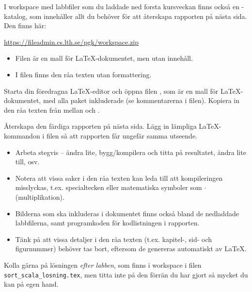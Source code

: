 \begin{Datorarbete}
	\item I workspace med labbfiler som du laddade ned forsta kursveckan finns också en -katalog, som innehåller allt du behöver för att återskapa rapporten på nästa sida. Den finns här:
	
	\url{https://fileadmin.cs.lth.se/pgk/workspace.zip}
	
	\begin{itemize}
		\item Filen  är en mall för \LaTeX-dokumentet, men utan innehåll.
		\item I filen  finns den råa texten utan formattering.
	\end{itemize}
	\item Starta din föredragna \LaTeX-editor och öppna filen , som är en mall för \LaTeX-dokumentet, med alla paket inkluderade (se kommentarerna i filen). Kopiera in den råa texten från  mellan \verb// och \verb//.
	\item Återskapa den färdiga rapporten på nästa sida. Lägg in lämpliga \LaTeX-kommandon i filen så att rapporten får ungefär samma utseende.
	\begin{itemize}
		\item Arbeta stegvis -- ändra lite, bygg/kompilera och titta på resultatet, ändra lite till, osv.
		\item Notera att vissa saker i den råa texten kan leda till att kompileringen misslyckas, t.ex. specialtecken eller matematiska symboler som \(\cdot\) (multiplikation).
		\item Bilderna som ska inkluderas i dokumentet finns också bland de nedladdade labbfilerna, samt programkoden för kodlistningen i rapporten.
		\item Tänk på att vissa detaljer i den råa texten (t.ex. kapitel-, sid- och figurnummer) behöver tas bort, eftersom de genereras automatiskt av \LaTeX.
	\end{itemize}

	\item Kolla gärna på lösningen \emph{efter labben}, som finns i workspace i filen \texttt{sort\_scala\_losning.tex}, men titta inte på den förrän du har gjort så mycket du kan på egen hand.


\end{Datorarbete}
